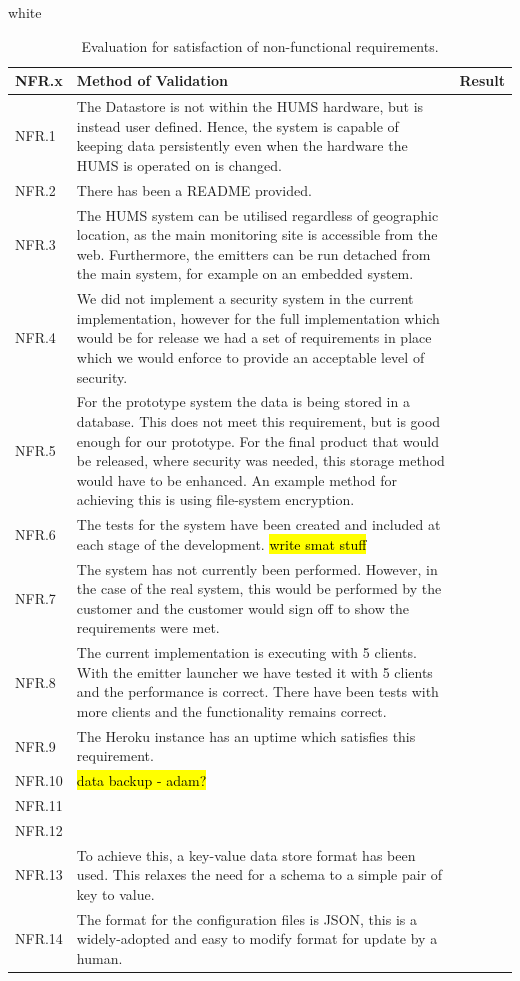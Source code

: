 \documentclass[10pt,a4paper]{article}
\newcommand{\xtableformat}[4]{
\begin{table}[ht!]
\centering
  \rowcolors{2}{gray!10} {white}
\begin{tabularx}{\textwidth}{#1}
  \hline
  \rowcolor[gray]{0.9} #2
  \hline
\end{tabularx}
\caption{#3}
\label{#4}
\end{table}}
\begin{document}
\xtableformat{ p{1.3cm} X X }{
	NFR.x  & 	Method of Validation & Result \\ \hline
	NFR.1  &The Datastore is not within the HUMS hardware, but is instead user defined. Hence, the system is capable of keeping data persistently even when the hardware the HUMS is operated on is changed. 	  & 	 \\ 
	NFR.2  &There has been a README provided. 	  & 	 \\ 
	NFR.3  & 	The HUMS system can be utilised regardless of geographic location, as the main monitoring site is accessible from the web. Furthermore, the emitters can be run detached from the main system, for example on an embedded system. 	  & 	 \\ 
	NFR.4  &We did not implement a security system in the current implementation, however for the full implementation which would be for release we had a set of requirements in place which we would enforce to provide an acceptable level of security. 	  & 	\\ 
	NFR.5  & For the prototype system the data is being stored in a database. This does not meet this requirement, but is good enough for our prototype. For the final product that would be released, where security was needed, this storage method would have to be enhanced. An example method for achieving this is using file-system encryption. & \\
	NFR.6  &The tests for the system have been created and included at each stage of the development. \hl{write smat stuff} 	  & 	\\
	NFR.7  &The system has not currently been performed. However, in the case of the real system, this would be performed by the customer and the customer would sign off to show the requirements were met. 	  & 	 \\
	NFR.8  &The current implementation is executing with 5 clients. With the emitter launcher we have tested it with 5 clients and the performance is correct. There have been tests with more clients and the functionality remains correct.	  & 	 \\ 
	NFR.9  & The Heroku instance has an uptime which satisfies this requirement.	  & 	 \\ 
	NFR.10  & \hl{data backup - adam?}	  & 	 \\ 
	NFR.11  & 	  & 	 \\ 
	NFR.12  & 	  & 	 \\ 
	NFR.13  & 	To achieve this, a key-value data store format has been used. This relaxes the need for a schema to a simple pair of key to value.  & 	 \\
	NFR.14  & 	The format for the configuration files is JSON, this is a widely-adopted and easy to modify format for update by a human.  & 	 \\
}{Evaluation for satisfaction of non-functional requirements.}{nfrevaltable} %
\end{document}
